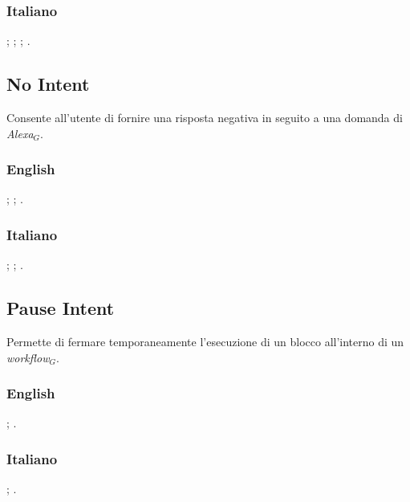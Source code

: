 \subsubsection{Italiano}

\begin{itemize}
	
	;
	;
	;
	.
	
\end{itemize}


\subsection{No Intent}
Consente all'utente di fornire una risposta negativa in seguito a una domanda di \textit{Alexa$_{G}$}.
\subsubsection{English}
\begin{itemize}
	
	;
	;
	.
	
\end{itemize}

\subsubsection{Italiano}
\begin{itemize}	
	;
	;
	.
	
\end{itemize}



\subsection{Pause Intent}
Permette di fermare temporaneamente l'esecuzione di un blocco all'interno di un \textit{workflow$_{G}$}.
\subsubsection{English}
\begin{itemize}
	
	;
	.
	
\end{itemize}

\subsubsection{Italiano}
\begin{itemize}
	
	;
	.
	
\end{itemize}


